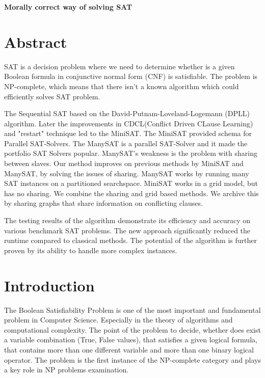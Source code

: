 \documentclass[12pt] {article}
\begin{document}
\begin{titlepage}
    \centering
    \vspace{.7\baselineskip}
    {\huge \textbf{Morally correct way of solving SAT}}
\end{titlepage}

\newpage

\section{Abstract}
SAT is a decision problem where we need to determine whether is a given Boolean formula in conjunctive normal form (CNF) is satisfiable. The problem is NP-complete, which means that there isn’t a known algorithm which could efficiently solves SAT problem.

The Sequential SAT based on the David-Putnam-Loveland-Logemann (DPLL) algorithm. Later the improvements in CDCL(Conflict Driven CLause Learning) and "restart" technique led to the MiniSAT. The MiniSAT provided schema for Parallel SAT-Solvers. The ManySAT is a parallel SAT-Solver and it made the portfolio SAT Solvers popular. ManySAT's weakness is the problem with sharing between slaves. Our method improves on previous methods by MiniSAT and ManySAT, by solving the issues of sharing. ManySAT works by running many SAT instances on a partitioned searchspace. MiniSAT works in a grid model, but has no sharing. We combine the sharing and grid based methods. We archive this by sharing graphs that share information on conflicting clauses.

The testing results of the algorithm demonstrate its efficiency and accuracy on various benchmark SAT problems. The new approach significantly reduced the runtime compared to classical methods. The potential of the algorithm is further proven by its ability to handle more complex instances.

\section{Introduction}
The Boolean Satisfiability Problem  is one of the most important and fundamental problem in Computer Science. Especially in the theory of algorithms and computational complexity. The point of the problem to decide, whether does exist a variable combination (True, False values), that satisfies a given logical formula, that contains more than one different variable and more than one binary logical operator. The problem is the first instance of the NP-complete category and plays a key role in NP problems examination.
\end{document}
